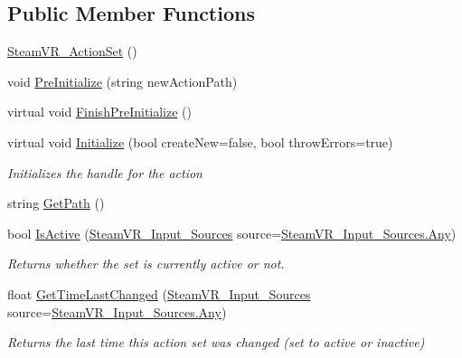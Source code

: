 \subsection*{Public Member Functions}
\begin{DoxyCompactItemize}
\item 
\mbox{\hyperlink{class_valve_1_1_v_r_1_1_steam_v_r___action_set_a91a20f8025cb5281f23e9c7d519af517}{Steam\+V\+R\+\_\+\+Action\+Set}} ()
\item 
void \mbox{\hyperlink{class_valve_1_1_v_r_1_1_steam_v_r___action_set_ab74fc162e267b0074066bff7b0166fc3}{Pre\+Initialize}} (string new\+Action\+Path)
\item 
virtual void \mbox{\hyperlink{class_valve_1_1_v_r_1_1_steam_v_r___action_set_aea6a8312c74c796f16de4480d14b2230}{Finish\+Pre\+Initialize}} ()
\item 
virtual void \mbox{\hyperlink{class_valve_1_1_v_r_1_1_steam_v_r___action_set_a1f0049b024089d6ce2d2a71a19ef5c31}{Initialize}} (bool create\+New=false, bool throw\+Errors=true)
\begin{DoxyCompactList}\small\item\em Initializes the handle for the action \end{DoxyCompactList}\item 
string \mbox{\hyperlink{class_valve_1_1_v_r_1_1_steam_v_r___action_set_a2d9abb96df39d29be3ea763a95d56b9c}{Get\+Path}} ()
\item 
bool \mbox{\hyperlink{class_valve_1_1_v_r_1_1_steam_v_r___action_set_a90637da41a53066829ee8bd3e06a3ce9}{Is\+Active}} (\mbox{\hyperlink{namespace_valve_1_1_v_r_a82e5bf501cc3aa155444ee3f0662853f}{Steam\+V\+R\+\_\+\+Input\+\_\+\+Sources}} source=\mbox{\hyperlink{namespace_valve_1_1_v_r_a82e5bf501cc3aa155444ee3f0662853faed36a1ef76a59ee3f15180e0441188ad}{Steam\+V\+R\+\_\+\+Input\+\_\+\+Sources.\+Any}})
\begin{DoxyCompactList}\small\item\em Returns whether the set is currently active or not. \end{DoxyCompactList}\item 
float \mbox{\hyperlink{class_valve_1_1_v_r_1_1_steam_v_r___action_set_ae535aed06b1d430319f22923e71bacc7}{Get\+Time\+Last\+Changed}} (\mbox{\hyperlink{namespace_valve_1_1_v_r_a82e5bf501cc3aa155444ee3f0662853f}{Steam\+V\+R\+\_\+\+Input\+\_\+\+Sources}} source=\mbox{\hyperlink{namespace_valve_1_1_v_r_a82e5bf501cc3aa155444ee3f0662853faed36a1ef76a59ee3f15180e0441188ad}{Steam\+V\+R\+\_\+\+Input\+\_\+\+Sources.\+Any}})
\begin{DoxyCompactList}\small\item\em Returns the last time this action set was changed (set to active or inactive) \end{DoxyCompactList}\item 

\end{DoxyCompactItemize}
